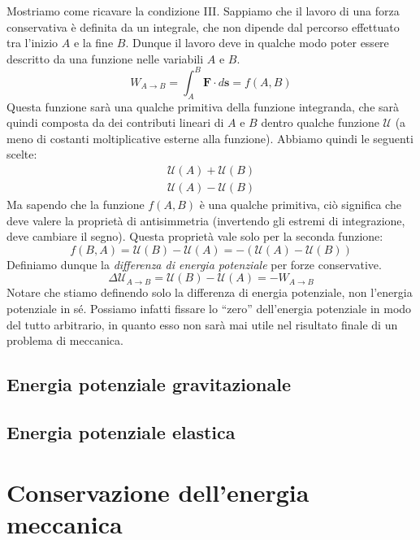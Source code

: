 Mostriamo come ricavare la condizione III. Sappiamo che il lavoro di una
forza conservativa è definita da un integrale, che non dipende dal percorso
effettuato tra l'inizio $A$ e la fine $B$. Dunque il lavoro deve in qualche modo
poter essere descritto da una funzione nelle variabili $A$ e $B$.
\[ W_{A \to B} = \int_{A}^{B}\mathbf{F}\cdot d\mathbf{s} = f(A,B) \]
Questa funzione sarà una qualche primitiva della funzione integranda, che sarà
quindi composta da dei contributi lineari di $A$ e $B$ dentro qualche funzione
$\mathcal{U}$ (a meno di costanti moltiplicative esterne alla funzione).
Abbiamo quindi le seguenti scelte:
\begin{align*}
    \mathcal{U}(A) + \mathcal{U}(B)\\
    \mathcal{U}(A) - \mathcal{U}(B)
\end{align*}
Ma sapendo che la funzione $f(A,B)$ è una qualche primitiva, ciò significa che
deve valere la proprietà di antisimmetria (invertendo gli estremi di integrazione,
deve cambiare il segno). Questa proprietà vale solo per la seconda funzione:
\[ f(B,A) = \mathcal{U}(B) - \mathcal{U}(A) = - (\mathcal{U}(A) - \mathcal{U}(B)) \]
Definiamo dunque la \textit{differenza di energia potenziale} per forze conservative.
\[ \Delta\mathcal{U}_{A\to B} = \mathcal{U}(B) - \mathcal{U}(A) = -W_{A\to B} \]
Notare che stiamo definendo solo la differenza di energia potenziale, non l'energia
potenziale in sé. Possiamo infatti fissare lo ``zero'' dell'energia potenziale in
modo del tutto arbitrario, in quanto esso non sarà mai utile nel risultato finale
di un problema di meccanica.

\subsection{Energia potenziale gravitazionale}
\subsection{Energia potenziale elastica}

\section{Conservazione dell'energia meccanica}